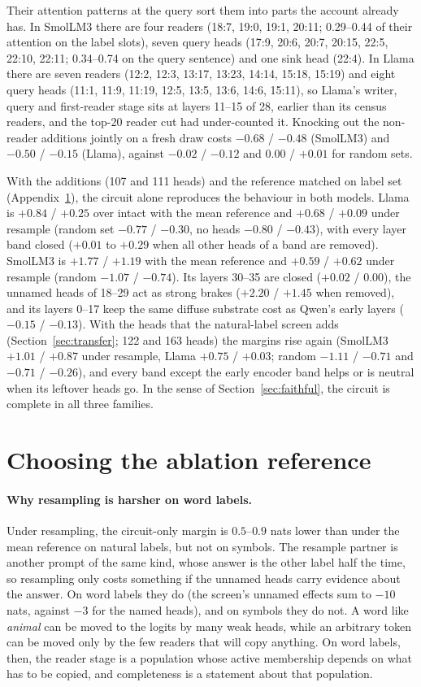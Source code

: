 \documentclass{article}
\begin{document}
Their attention patterns at the query sort them into parts the account already has. In SmolLM3 there are four readers (18:7, 19:0, 19:1, 20:11; 0.29--0.44 of their attention on the label slots), seven query heads (17:9, 20:6, 20:7, 20:15, 22:5, 22:10, 22:11; 0.34--0.74 on the query sentence) and one sink head (22:4). In Llama there are seven readers (12:2, 12:3, 13:17, 13:23, 14:14, 15:18, 15:19) and eight query heads (11:1, 11:9, 11:19, 12:5, 13:5, 13:6, 14:6, 15:11), so Llama's writer, query and first-reader stage sits at layers 11--15 of 28, earlier than its census readers, and the top-20 reader cut had under-counted it. Knocking out the non-reader additions jointly on a fresh draw costs $-0.68$ / $-0.48$ (SmolLM3) and $-0.50$ / $-0.15$ (Llama), against $-0.02$ / $-0.12$ and $0.00$ / $+0.01$ for random sets.

With the additions (107 and 111 heads) and the reference matched on label set (Appendix~\ref{app:reference}), the circuit alone reproduces the behaviour in both models. Llama is $+0.84$ / $+0.25$ over intact with the mean reference and $+0.68$ / $+0.09$ under resample (random set $-0.77$ / $-0.30$, no heads $-0.80$ / $-0.43$), with every layer band closed ($+0.01$ to $+0.29$ when all other heads of a band are removed). SmolLM3 is $+1.77$ / $+1.19$ with the mean reference and $+0.59$ / $+0.62$ under resample (random $-1.07$ / $-0.74$). Its layers 30--35 are closed ($+0.02$ / $0.00$), the unnamed heads of 18--29 act as strong brakes ($+2.20$ / $+1.45$ when removed), and its layers 0--17 keep the same diffuse substrate cost as Qwen's early layers ($-0.15$ / $-0.13$). With the heads that the natural-label screen adds (Section~\ref{sec:transfer}; 122 and 163 heads) the margins rise again (SmolLM3 $+1.01$ / $+0.87$ under resample, Llama $+0.75$ / $+0.03$; random $-1.11$ / $-0.71$ and $-0.71$ / $-0.26$), and every band except the early encoder band helps or is neutral when its leftover heads go. In the sense of Section~\ref{sec:faithful}, the circuit is complete in all three families.

\section{Choosing the ablation reference}\label{app:reference}
\paragraph{Why resampling is harsher on word labels.} Under resampling, the circuit-only margin is $0.5$--$0.9$ nats lower than under the mean reference on natural labels, but not on symbols. The resample partner is another prompt of the same kind, whose answer is the other label half the time, so resampling only costs something if the unnamed heads carry evidence about the answer. On word labels they do (the screen's unnamed effects sum to $-10$ nats, against $-3$ for the named heads), and on symbols they do not. A word like \emph{animal} can be moved to the logits by many weak heads, while an arbitrary token can be moved only by the few readers that will copy anything. On word labels, then, the reader stage is a population whose active membership depends on what has to be copied, and completeness is a statement about that population.
\end{document}
